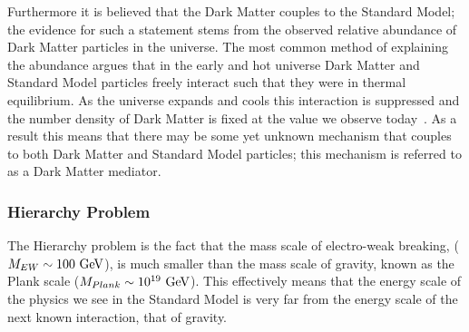 Furthermore it is believed that the Dark Matter couples to the Standard Model;
the evidence for such a statement stems from the observed relative abundance of Dark Matter particles in the universe.
The most common method of explaining the abundance
argues that in the early and hot universe Dark Matter and Standard Model particles
freely interact such that they were in thermal equilibrium.
As the universe expands and cools this interaction is suppressed
and the number density of Dark Matter is fixed at the value we observe today~\cite{theo-bsm_dm_feng}.
As a result this means that there may be some yet unknown mechanism that couples to both Dark Matter and
Standard Model particles; this mechanism is referred to as a Dark Matter mediator.

\subsubsection{Hierarchy Problem}

The Hierarchy problem is the fact that the mass scale of electro-weak breaking, ($M_{EW}\nobreak\sim\nobreak100~\text{GeV}$),
is much smaller than the mass scale of gravity,
known as the Plank scale ($M_{Plank}\nobreak\sim\nobreak10^{19}~\text{GeV}$).
This effectively means that the energy scale of the physics we see in the Standard Model is very far
from the energy scale of the next known interaction, that of gravity.

